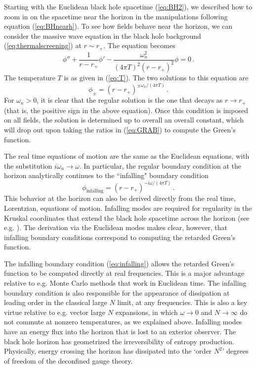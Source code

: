 \documentclass[10pt, oneside]{book}
\def\be{\begin{equation}}
\def\ee{\end{equation}}
\begin{document}
\begin{doublespace}
Starting with the Euclidean black hole spacetime (\ref{eq:BH2}), we described how to zoom in on the spacetime near the horizon in the manipulations following equation (\ref{eq:BHnearh}). To see how fields behave near the horizon, we can consider the massive wave equation in the black hole background (\ref{eq:thermalscreening}) at $r \sim r_+$. The equation becomes
\be
\phi'' + \frac{1}{r-r_+} \phi' - \frac{\omega_n^2}{(4 \pi T)^2 (r-r_+)^2} \phi = 0 \,.
\ee
The temperature $T$ is as given in (\ref{eq:T}). The two solutions to this equation are
\be
\phi_\pm = \left(r - r_+ \right)^{\pm \omega_n/(4 \pi T)} \,.
\ee
For $\omega_n >0$, it is clear that the regular solution is the one that decays as $r \to r_+$ (that is, the positive sign in the above equation). Once this condition is imposed on all fields, the solution is determined up to overall an overall constant, which will drop out upon taking the ratios in (\ref{eq:GRAB}) to compute the Green's function.

The real time equations of motion are the same as the Euclidean equations, with the substitution $i \omega_n \to \omega$. In particular, the regular boundary condition at the horizon analytically continues to the ``infalling" boundary condition
\be\label{eq:infalling}
\phi_\text{infalling} = \left(r - r_+ \right)^{- i \omega/(4 \pi T)} \,.
\ee
This behavior at the horizon can also be derived directly from the real time, Lorentzian, equations of motion. Infalling modes are required for regularity in the Kruskal coordinates that extend the black hole spacetime across the horizon (see e.g. \cite{Hartnoll:2009sz}). The derivation via the Euclidean modes makes clear, however, that infalling boundary conditions correspond to computing the retarded Green's function.

The infalling boundary condition (\ref{eq:infalling}) allows the retarded Green's function to be computed directly at real frequencies. This is a major advantage relative to e.g. Monte Carlo methods that work in Euclidean time. The infalling boundary condition is also responsible for the appearance of dissipation at leading order in the classical large $N$ limit, at any frequencies. This is also a key virtue relative to e.g. vector large $N$ expansions, in which $\omega \to 0$ and $N \to \infty$ do not commute at nonzero temperatures, as we explained above. Infalling modes have an energy flux into the horizon that is lost to an exterior observer. The black hole horizon has geometrized the irreversibility of entropy production. Physically, energy crossing the horizon has dissipated into the `order $N^2$' degrees of freedom of the deconfined gauge theory.


\end{doublespace}
\end{document}
